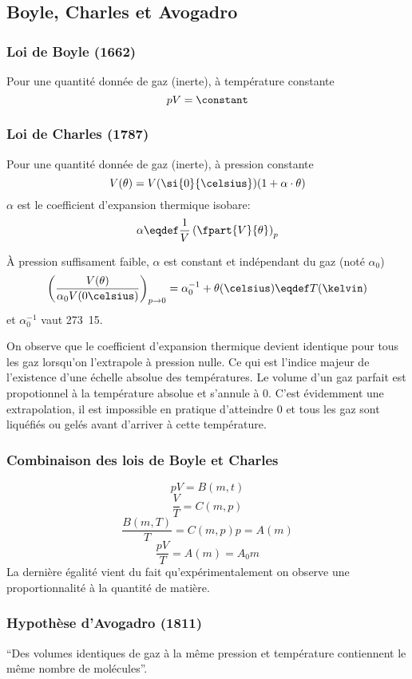 \subsection{Boyle, Charles et Avogadro}
\subsubsection{Loi de Boyle (1662)}
Pour une quantité donnée de gaz (inerte), à température constante
\[ pV = \constant \]

\subsubsection{Loi de Charles (1787)}
Pour une quantité donnée de gaz (inerte), à pression constante
\[ V(\theta) = V(\si{0}{\celsius})(1 + \alpha \cdot \theta) \]
$\alpha$ est le coefficient d'expansion thermique isobare:
\[ \alpha \eqdef
\frac{1}{V}\left(\fpart{V}{\theta}\right)_p \]

À pression suffisament faible,
$\alpha$ est constant et indépendant du gaz (noté $\alpha_0$)
\[ \left(\frac{V(\theta)}{\alpha_0 V(0\celsius)}\right)_{p\rightarrow 0} =
\alpha_0^{-1}+\theta(\celsius) \eqdef T(\kelvin) \]
et $\alpha_0^{-1}$ vaut \si{273.15}{\celsius}.

On observe que le coefficient d'expansion thermique devient identique
pour tous les gaz lorsqu'on l'extrapole à pression nulle.
Ce qui est l'indice majeur de l'existence
d'une échelle absolue des températures.
Le volume d'un gaz parfait est propotionnel à la température absolue et
s'annule à \si{0}{\kelvin}.
C'est évidemment une extrapolation, il est impossible en pratique d'atteindre
\si{0}{\kelvin} et tous les gaz sont liquéfiés ou
gelés avant d'arriver à cette température.

\subsubsection{Combinaison des lois de Boyle et Charles}
\[ pV = B(m,t) \]
\[ \frac{V}{T} = C(m,p) \]
\[ \frac{B(m,T)}{T} = C(m,p)p = A(m) \]
\[ \frac{pV}{T} = A(m) = A_0m \]
La dernière égalité vient du fait qu'expérimentalement on observe
une proportionnalité à la quantité de matière.

\subsubsection{Hypothèse d'Avogadro (1811)}
``Des volumes identiques de gaz à la même pression et
température contiennent le même nombre de molécules''.

